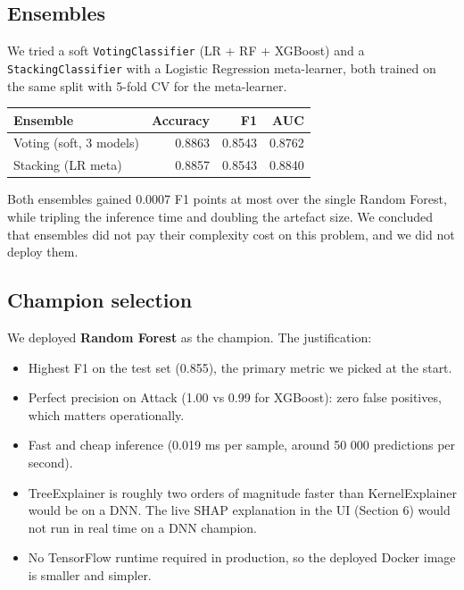 \subsection{Ensembles}\label{ensembles}

We tried a soft \texttt{VotingClassifier} (LR + RF + XGBoost) and a
\texttt{StackingClassifier} with a Logistic Regression meta-learner,
both trained on the same split with 5-fold CV for the meta-learner.

\begin{longtable}[]{@{}lrrr@{}}
\toprule\noalign{}
Ensemble & Accuracy & F1 & AUC \\
\midrule\noalign{}
\endhead
\bottomrule\noalign{}
\endlastfoot
Voting (soft, 3 models) & 0.8863 & 0.8543 & 0.8762 \\
Stacking (LR meta) & 0.8857 & 0.8543 & 0.8840 \\
\end{longtable}

Both ensembles gained 0.0007 F1 points at most over the single Random
Forest, while tripling the inference time and doubling the artefact
size. We concluded that ensembles did not pay their complexity cost on
this problem, and we did not deploy them.

\subsection{Champion selection}\label{champion-selection}

We deployed \textbf{Random Forest} as the champion. The justification:

\begin{itemize}
\tightlist
\item
  Highest F1 on the test set (0.855), the primary metric we picked at
  the start.
\item
  Perfect precision on Attack (1.00 vs 0.99 for XGBoost): zero false
  positives, which matters operationally.
\item
  Fast and cheap inference (0.019 ms per sample, around 50 000
  predictions per second).
\item
  TreeExplainer is roughly two orders of magnitude faster than
  KernelExplainer would be on a DNN. The live SHAP explanation in the UI
  (Section 6) would not run in real time on a DNN champion.
\item
  No TensorFlow runtime required in production, so the deployed Docker
  image is smaller and simpler.
\end{itemize}

